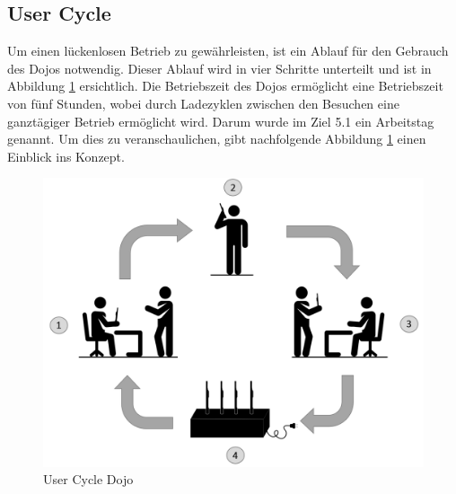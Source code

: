 \subsection{User Cycle}\label{sec:ladeablauf}

Um einen lückenlosen Betrieb zu gewährleisten, ist ein Ablauf für den Gebrauch des Dojos notwendig. Dieser Ablauf wird in vier Schritte unterteilt und ist in Abbildung \ref{fig:Ladezyklus Dojo} ersichtlich.
Die Betriebszeit des Dojos ermöglicht eine Betriebszeit von fünf Stunden, wobei durch Ladezyklen zwischen den Besuchen eine ganztägiger Betrieb ermöglicht wird. Darum wurde im Ziel 5.1 ein Arbeitstag genannt. Um dies zu veranschaulichen, gibt nachfolgende Abbildung \ref{fig:Ladezyklus Dojo} einen Einblick ins Konzept.

\begin{figure}[H]
	\begin{center}
		\includegraphics[width=140mm]{data/Ladezyklus.png}
		\caption[User Cycle Dojo]{User Cycle Dojo} %
		\label{fig:Ladezyklus Dojo}
	\end{center}
\end{figure}

